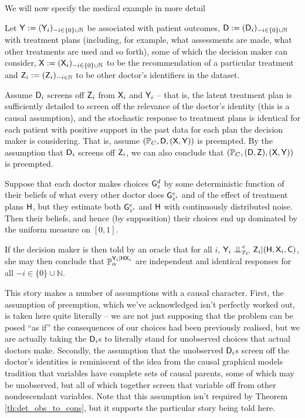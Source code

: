 We will now specify the medical example in more detail
\begin{example}\label{ex:doctor_detailed}
Let $\mathsf{Y}:=(\mathsf{Y}_i)_{-i\in \{0\}\cup\mathbb{N}}$ be associated with patient outcomes, $\mathsf{D}:=(\mathsf{D}_i)_{-i\in \{0\}\cup\mathbb{N}}$ with treatment plans (including, for example, what assessments are made, what other treatments are used and so forth), some of which the decision maker can consider, $\mathsf{X}:=(\mathsf{X}_i)_{-i\in \{0\}\cup\mathbb{N}}$ to be the recommendation of a particular treatment and $\mathsf{Z}_i:= (\mathsf{Z}_i)_{-i\in \mathbb{N}}$ to be other doctor's identifiers in the dataset.

Assume $\mathsf{D}_i$ screens off $\mathsf{Z}_i$ from $\mathsf{X}_i$ and $\mathsf{Y}_i$ -- that is, the latent treatment plan is sufficiently detailed to screen off the relevance of the doctor's identity (this is a causal assumption), and the stochastic response to treatment plans is identical for each patient with positive support in the past data for each plan the decision maker is considering. That is, assume $(\mathbb{P}_C,\mathsf{D},(\mathsf{X},\mathsf{Y}))$ is preempted. By the assumption that $\mathsf{D}_i$ screens off $\mathsf{Z}_i$, we can also conclude that $(\mathbb{P}_C,(\mathsf{D},\mathsf{Z}),(\mathsf{X},\mathsf{Y}))$ is preempted.

Suppose that each doctor makes choices $\mathsf{G}^d_z$ by some deterministic function of their beliefs of what every other doctor does $\mathsf{G}^e_{z'}$ and of the effect of treatment plans $\mathsf{H}$, but they estimate both $\mathsf{G}^e_{z'}$ and $\mathsf{H}$ with continuously distributed noise. Then their beliefs, and hence (by supposition) their choices end up dominated by the uniform measure on $[0,1]$.

If the decision maker is then told by an oracle that for all $i$, $\RV{Y}_i\CI^e_{\prob{P}_C} \RV{Z}_i|(\RV{H},\RV{X}_i,\RV{C})$, she may then conclude that $\mathbb{P}_\alpha^{\mathsf{Y}_i|\mathsf{H}\mathsf{X}_i}$ are independent and identical responses for all $-i\in\{0\}\cup\mathbb{N}$.
\end{example}

This story makes a number of assumptions with a causal character. First, the assumption of preemption, which we've acknowledged isn't perfectly worked out, is taken here quite literally -- we are not just supposing that the problem can be posed ``as if'' the consequences of our choices had been previously realised, but we are actually taking the $\mathsf{D}_i$s to literally stand for unobserved choices that actual doctors make. Secondly, the assumption that the unobserved $\mathsf{D}_i$s screen off the doctor's identities is reminiscent of the idea from the causal graphical models tradition that variables have complete sets of causal parents, some of which may be unobserved, but all of which together screen that variable off from other nondescendant variables. Note that this assumption isn't required by Theorem \ref{th:det_obs_to_cons}, but it supports the particular story being told here.

